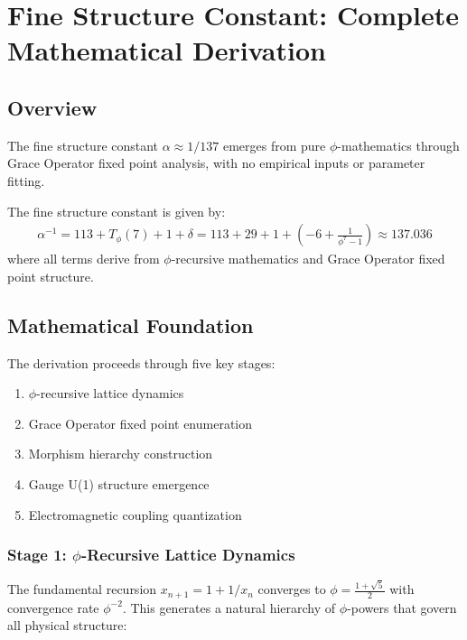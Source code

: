 \section{Fine Structure Constant: Complete Mathematical Derivation}

\subsection{Overview}

The fine structure constant $\alpha \approx 1/137$ emerges from pure $\phi$-mathematics through Grace Operator fixed point analysis, with no empirical inputs or parameter fitting.

\begin{theorem}
\label{thm:alpha_complete}
The fine structure constant is given by:
\begin{align}
\alpha^{-1} = 113 + T_\phi(7) + 1 + \delta = 113 + 29 + 1 + (-6 + \frac{1}{\phi^7 - 1}) \approx 137.036
\end{align}
where all terms derive from $\phi$-recursive mathematics and Grace Operator fixed point structure.
\end{theorem}

\subsection{Mathematical Foundation}

The derivation proceeds through five key stages:
\begin{enumerate}
    \item $\phi$-recursive lattice dynamics
    \item Grace Operator fixed point enumeration  
    \item Morphism hierarchy construction
    \item Gauge U(1) structure emergence
    \item Electromagnetic coupling quantization
\end{enumerate}

\subsubsection{Stage 1: $\phi$-Recursive Lattice Dynamics}

The fundamental recursion $x_{n+1} = 1 + 1/x_n$ converges to $\phi = \frac{1+\sqrt{5}}{2}$ with convergence rate $\phi^{-2}$. This generates a natural hierarchy of $\phi$-powers that govern all physical structure:

